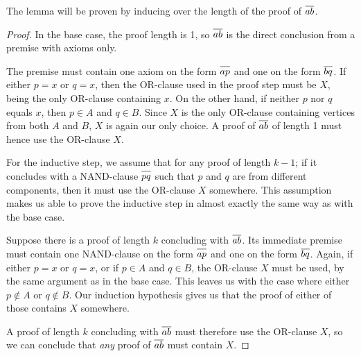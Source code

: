 The lemma will be proven by inducing over the length of the proof of $\ol{ab}$.
\begin{proof}
  In the base case, the proof length is 1, so $\ol{ab}$ is the direct conclusion from a premise with axioms only.
  \begin{figure}[!h]
    \centering
    \begin{prooftree*}
      \Hypo{\dots}
    \end{prooftree*}
    \caption{}
    \label{fig:ab_proof_bc}
  \end{figure}
  The premise must contain one axiom on the form $\ol{ap}$ and one on the form $\ol{bq}$.
  If either $p = x$ or $q = x$, then the OR-clause used in the proof step must be $X$, being the only OR-clause containing $x$.
  On the other hand, if neither $p$ nor $q$ equals $x$, then $p \in A$ and $q \in B$.
  Since $X$ is the only OR-clause containing vertices from both $A$ and $B$, $X$ is again our only choice.
  A proof of $\ol{ab}$ of length 1 must hence use the OR-clause $X$.

  For the inductive step, we assume that for any proof of length $k-1$; if it concludes with a NAND-clause $\ol{pq}$ such that $p$ and $q$ are from different components, then it must use the OR-clause $X$ somewhere.
  This assumption makes us able to prove the inductive step in almost exactly the same way as with the base case.

  Suppose there is a proof of length $k$ concluding with $\ol{ab}$.
  Its immediate premise must contain one NAND-clause on the form $\ol{ap}$ and one on the form $\ol{bq}$.
  Again, if either $p=x$ or $q=x$, or if $p \in A$ and $q \in B$, the OR-clause $X$ must be used, by the same argument as in the base case.
  This leaves us with the case where either $p \not\in A$ or $q \not\in B$.
  Our induction hypothesis gives us that the proof of either of those contains $X$ somewhere.

  A proof of length $k$ concluding with $\ol{ab}$ must therefore use the OR-clause $X$, so we can conclude that \textit{any} proof of $\ol{ab}$ must contain $X$.
\end{proof}

